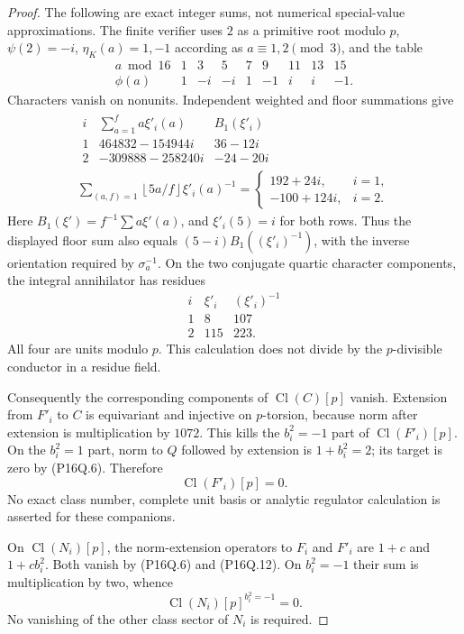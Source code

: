 \begin{proof}
The following are exact integer sums, not numerical special-value
approximations.  The finite verifier uses $2$ as a primitive root
modulo $p$, $\psi(2)=-i$, $\eta_K(a)=1,-1$ according as
$a\equiv1,2\pmod3$, and the table
\[
 \begin{array}{c|rrrrrrrr}
 a\bmod16&1&3&5&7&9&11&13&15\\ \hline
 \phi(a)&1&-i&-i&1&-1&i&i&-1.
 \end{array}
 \tag{P16Q.9}
\]
Characters vanish on nonunits.  Independent weighted and floor
summations give
\[
 \begin{gathered}
 \begin{array}{c|c|c}
 i&\sum_{a=1}^f a\xi'_i(a)&B_1(\xi'_i)\\ \hline
 1&464832-154944i&36-12i\\
 2&-309888-258240i&-24-20i
 \end{array}\\[3pt]
 \sum_{(a,f)=1}\left\lfloor5a/f\right\rfloor\xi'_i(a)^{-1}
 =\begin{cases}192+24i,&i=1,\\-100+124i,&i=2.\end{cases}
 \end{gathered}
 \tag{P16Q.10}
\]
Here $B_1(\xi')=f^{-1}\sum a\xi'(a)$, and
$\xi'_i(5)=i$ for both rows.
Thus the displayed floor sum also equals
$(5-i)B_1((\xi'_i)^{-1})$, with the inverse orientation required
by $\sigma_a^{-1}$.
On the two conjugate quartic character components, the integral
annihilator has residues
\[
 \begin{array}{c|cc}
 i&\xi'_i&(\xi'_i)^{-1}\\ \hline
 1&8&107\\
 2&115&223.
 \end{array}
 \tag{P16Q.11}
\]
All four are units modulo $p$.  This calculation does not divide
by the $p$-divisible conductor in a residue field.

Consequently the corresponding components of
$\operatorname{Cl}(C)[p]$ vanish.
Extension from $F'_i$ to $C$ is equivariant and injective on
$p$-torsion, because norm after extension is multiplication
by $1072$.  This kills the $b_i^2=-1$ part of
$\operatorname{Cl}(F'_i)[p]$.
On the $b_i^2=1$ part, norm to $Q$ followed by extension is
$1+b_i^2=2$; its target is zero by (P16Q.6).
Therefore
\[
                         \operatorname{Cl}(F'_i)[p]=0.
 \tag{P16Q.12}
\]
No exact class number, complete unit basis or analytic regulator
calculation is asserted for these companions.

On $\operatorname{Cl}(N_i)[p]$, the norm-extension operators
to $F_i$ and $F'_i$ are $1+c$ and $1+cb_i^2$.
Both vanish by (P16Q.6) and (P16Q.12).
On $b_i^2=-1$ their sum is multiplication by two, whence
\[
                  \operatorname{Cl}(N_i)[p]^{b_i^2=-1}=0.
 \tag{P16Q.13}
\]
No vanishing of the other class sector of $N_i$ is required.


\end{proof}
